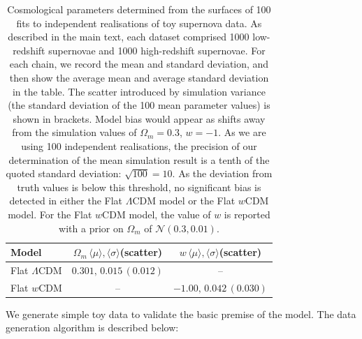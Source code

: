 \documentclass[a4paper,fleqn,usenatbib]{mnras}
\begin{document}
\begin{table}
	\centering
	\caption{Cosmological parameters determined from the surfaces of 100 fits to independent realisations of toy supernova data. As described in the main text, each dataset comprised 1000 low-redshift supernovae and 1000 high-redshift supernovae. For each chain, we record the mean and standard deviation, and then show the average mean and average standard deviation in the table. The scatter introduced by simulation variance (the standard deviation of the 100 mean parameter values) is shown in brackets. Model bias would appear as shifts away from the simulation values of $\Omega_m = 0.3$, $w = -1$. As we are using 100 independent realisations, the precision of our determination of the mean simulation result is a tenth of the quoted standard deviation: $\sqrt{100} = 10$. As the deviation from truth values is below this threshold, no significant bias is detected in either the Flat $\Lambda$CDM model or the Flat $w$CDM model. For the Flat $w$CDM model, the value of $w$ is reported with a prior on $\Omega_m$ of $\mathcal{N}(0.3, 0.01)$.}
	\label{tab:simple_model}
	\begin{tabular}{l|cc}
		\hline
		Model & $\Omega_m\, \langle\mu\rangle,\langle\sigma\rangle$(scatter) & $w\, \langle\mu\rangle,\langle\sigma\rangle$(scatter) \\ 
		\hline
		Flat $\Lambda$CDM & $0.301,\, 0.015\,(0.012)$ & -- \\ 
		Flat $w$CDM & -- & $-1.00,\, 0.042\,(0.030)$ \\ 
		\hline
	\end{tabular}
\end{table}

We generate simple toy data to validate the basic premise of the model. The data generation algorithm is described below:
\end{document}

